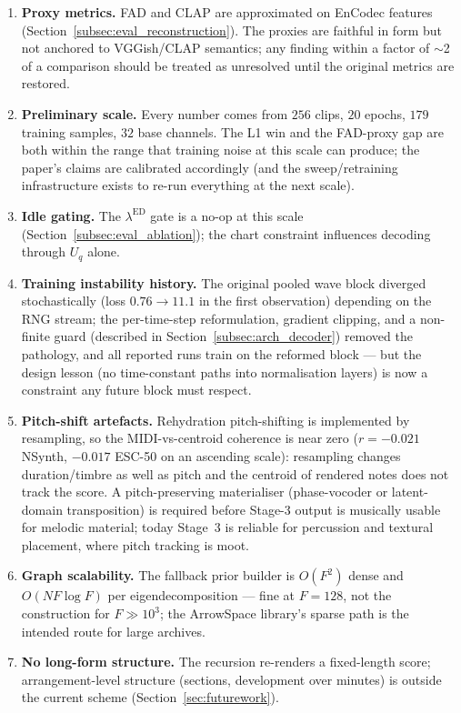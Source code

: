 \documentclass[12pt,a4paper]{article}
\begin{document}
\begin{enumerate}[leftmargin=*]
  \item \textbf{Proxy metrics.} FAD and CLAP are approximated on EnCodec
    features (Section~\ref{subsec:eval_reconstruction}). The proxies are
    faithful in form but not anchored to VGGish/CLAP semantics; any
    finding within a factor of $\sim$2 of a comparison should be treated
    as unresolved until the original metrics are restored.
  \item \textbf{Preliminary scale.} Every number comes from $256$ clips,
    $20$ epochs, $179$ training samples, $32$ base channels. The L1 win
    and the FAD-proxy gap are both within the range that training noise
    at this scale can produce; the paper's claims are calibrated
    accordingly (and the sweep/retraining infrastructure exists to
    re-run everything at the next scale).
  \item \textbf{Idle gating.} The $\lambda^{\mathrm{ED}}$ gate is a no-op
    at this scale (Section~\ref{subsec:eval_ablation}); the chart
    constraint influences decoding through $U_q$ alone.
  \item \textbf{Training instability history.} The original pooled wave
    block diverged stochastically (loss $0.76 \to 11.1$ in the first
    observation) depending on the RNG stream; the per-time-step
    reformulation, gradient clipping, and a non-finite guard (described
    in Section~\ref{subsec:arch_decoder}) removed the pathology, and
    all reported runs train on the reformed block — but the design
    lesson (no time-constant paths into normalisation layers) is now a
    constraint any future block must respect.
  \item \textbf{Pitch-shift artefacts.} Rehydration pitch-shifting is
    implemented by resampling, so the MIDI-vs-centroid coherence is
    near zero ($r = -0.021$ NSynth, $-0.017$ ESC-50 on an ascending
    scale):     resampling changes duration/timbre as well as pitch and the
    centroid of rendered notes does not track the score. A
    pitch-preserving materialiser (phase-vocoder or latent-domain
    transposition) is required before Stage-3 output is musically
    usable for melodic material; today Stage~3 is reliable for
    percussion and textural placement, where pitch tracking is moot.
  \item \textbf{Graph scalability.} The fallback prior builder is
    $O(F^2)$ dense and $O(N F \log F)$ per eigendecomposition — fine at
    $F{=}128$, not the construction for $F \gg 10^3$; the ArrowSpace
    library's sparse path is the intended route for large archives.
  \item \textbf{No long-form structure.} The recursion re-renders a
    fixed-length score; arrangement-level structure (sections,
    development over minutes) is outside the current scheme
    (Section~\ref{sec:futurework}).
\end{enumerate}
\end{document}
